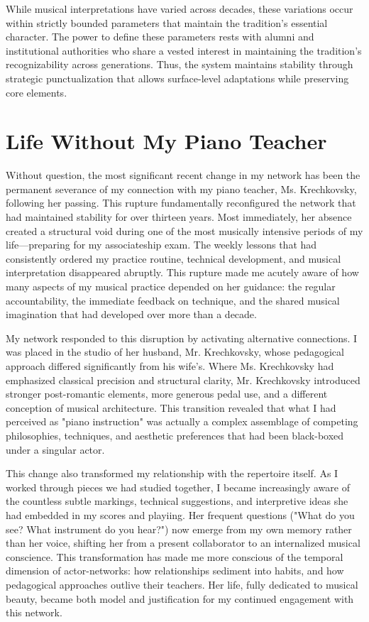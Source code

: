 \documentclass{article} %
\begin{document}
While musical interpretations have varied across decades, these variations occur within strictly bounded parameters that maintain the tradition's essential character. 
The power to define these parameters rests with alumni and institutional authorities who share a vested interest in maintaining the tradition's recognizability across generations. 
Thus, the system maintains stability through strategic punctualization that allows surface-level adaptations while preserving core elements.

\section{Life Without My Piano Teacher}

Without question, the most significant recent change in my network has been the permanent severance of my connection with my piano teacher, Ms. Krechkovsky, following her passing. 
This rupture fundamentally reconfigured the network that had maintained stability for over thirteen years.
Most immediately, her absence created a structural void during one of the most musically intensive periods of my life—preparing for my associateship exam. 
The weekly lessons that had consistently ordered my practice routine, technical development, and musical interpretation disappeared abruptly. 
This rupture made me acutely aware of how many aspects of my musical practice depended on her guidance: the regular accountability, the immediate feedback on technique, and the shared musical imagination that had developed over more than a decade.

My network responded to this disruption by activating alternative connections. 
I was placed in the studio of her husband, Mr. Krechkovsky, whose pedagogical approach differed significantly from his wife's. 
Where Ms. Krechkovsky had emphasized classical precision and structural clarity, Mr. Krechkovsky introduced stronger post-romantic elements, more generous pedal use, and a different conception of musical architecture. 
This transition revealed that what I had perceived as "piano instruction" was actually a complex assemblage of competing philosophies, techniques, and aesthetic preferences that had been black-boxed under a singular actor.

This change also transformed my relationship with the repertoire itself. 
As I worked through pieces we had studied together, I became increasingly aware of the countless subtle markings, technical suggestions, and interpretive ideas she had embedded in my scores and playiing. 
Her frequent questions ("What do you see? What instrument do you hear?") now emerge from my own memory rather than her voice, shifting her from a present collaborator to an internalized musical conscience.
This transformation has made me more conscious of the temporal dimension of actor-networks: how relationships sediment into habits, and how pedagogical approaches outlive their teachers.
Her life, fully dedicated to musical beauty, became both model and justification for my continued engagement with this network.
\end{document}
